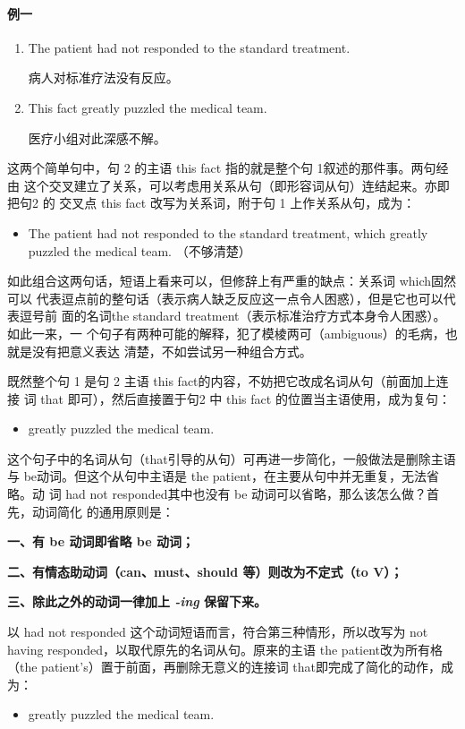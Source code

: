 \paragraph{例一}

\begin{enumerate}
\item The patient had not responded to the standard treatment.

  病人对标准疗法没有反应。
\item This fact greatly puzzled the medical team.

  医疗小组对此深感不解。
\end{enumerate}

这两个简单句中，句 2 的主语 this fact 指的就是整个句 1叙述的那件事。两句经由
这个交叉建立了关系，可以考虑用关系从句（即形容词从句）连结起来。亦即把句2 的
交叉点 this fact 改写为关系词，附于句 1 上作关系从句，成为：
\begin{itemize}
\item The patient had not responded to the standard treatment, which greatly
  puzzled the medical team. （不够清楚）
\end{itemize}

如此组合这两句话，短语上看来可以，但修辞上有严重的缺点：关系词 which固然可以
代表逗点前的整句话（表示病人缺乏反应这一点令人困惑），但是它也可以代表逗号前
面的名词the standard treatment（表示标准治疗方式本身令人困惑）。如此一来，一
个句子有两种可能的解释，犯了模棱两可（ambiguous）的毛病，也就是没有把意义表达
清楚，不如尝试另一种组合方式。

既然整个句 1 是句 2 主语 this fact的内容，不妨把它改成名词从句（前面加上连接
词 that 即可），然后直接置于句2 中 this fact 的位置当主语使用，成为复句：
\begin{itemize}
\item {} greatly
  puzzled the medical team.
\end{itemize}
这个句子中的名词从句（that引导的从句）可再进一步简化，一般做法是删除主语
与 be动词。但这个从句中主语是 the patient，在主要从句中并无重复，无法省略。动
词 had not responded其中也没有 be 动词可以省略，那么该怎么做？首先，动词简化
的通用原则是：

\textbf{一、有 be 动词即省略 be 动词；}

\textbf{二、有情态助动词（can、must、should 等）则改为不定式（to V）；}

\textbf{三、除此之外的动词一律加上 \emph{-ing} 保留下来。}

以 had not responded 这个动词短语而言，符合第三种情形，所以改写为 not having
responded，以取代原先的名词从句。原来的主语 the patient改为所有格（the
patient's）置于前面，再删除无意义的连接词 that即完成了简化的动作，成为：
\begin{itemize}
\item {}
  greatly puzzled the medical team.
\end{itemize}

